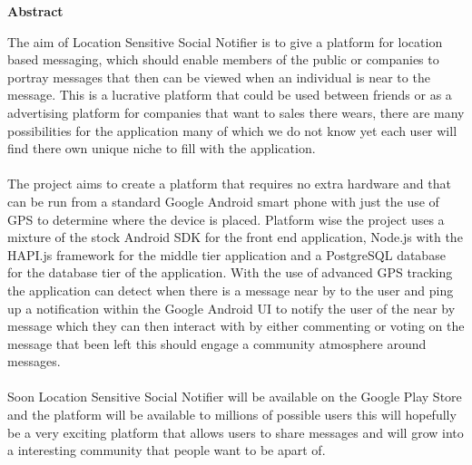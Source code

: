 \thispagestyle{empty}

\begin{center}
    {\LARGE\bf Abstract}
\end{center}

The aim of Location Sensitive Social Notifier is to give a platform for location based messaging, which should enable members of the public or companies to portray messages that then can be viewed when an individual is near to the message. This is a lucrative platform that could be used between friends or as a advertising platform for companies that want to sales there wears, there are many possibilities for the application many of which we do not know yet each user will find there own unique niche to fill with the application.\\
\\
The project aims to create a platform that requires no extra hardware and that can be run from a standard Google Android smart phone with just the use of GPS to determine where the device is placed. Platform wise the project uses a mixture of the stock Android SDK \cite{Google:androidAPIDocs:2015:online} for the front end application, Node.js\cite{nodeteam:node:2015:online} with the HAPI.js\cite{hapiteam:hapti:2015:online} framework for the middle tier application and a PostgreSQL\cite{Postgres:APIDocumentation:2015:online} database for the database tier of the application. With the use of advanced GPS tracking the application can detect when there is a message near by to the user and ping up a notification within the Google Android UI to notify the user of the near by message which they can then interact with by either commenting or voting on the message that been left this should engage a community atmosphere around messages.\\ 
\\
Soon Location Sensitive Social Notifier will be available on the Google Play Store and the platform will be available to millions of possible users this will hopefully be a very exciting platform that allows users to share messages and will grow into a interesting community that people want to be apart of.